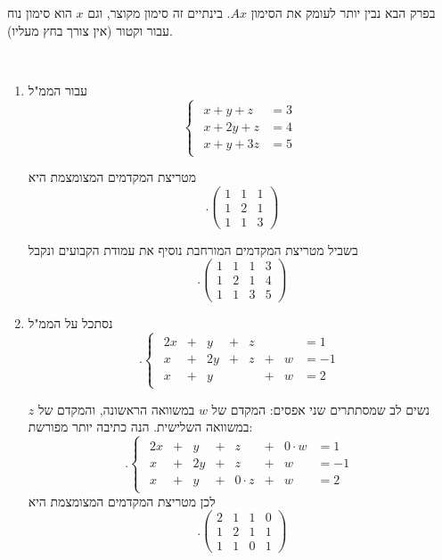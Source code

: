 \documentclass[
  hebrew,
  12pt,
  a4paper,
  oneside]{book}
\theoremstyle{definition}
\theoremstyle{remark}
\theoremstyle{plain}
\theoremstyle{remark}
\begin{document}
בפרק הבא נבין יותר לעומק את הסימון \(Ax\). בינתיים זה סימון מקוצר, וגם
\(x\) הוא סימון נוח עבור וקטור (אין צורך בחץ מעליו).

\begin{example}

~

\begin{enumerate}
\def\labelenumi{\arabic{enumi}.}
\item
  עבור הממ"ל \[\begin{cases}
  \begin{aligned}
  x+y+z&=3\\
  x+2y+z&=4\\
  x+y+3z&=5
  \end{aligned}
  \end{cases}\]

  מטריצת המקדמים המצומצמת היא \[.\begin{pmatrix}1 & 1 & 1\\
  1 & 2 & 1\\
  1 & 1 & 3
  \end{pmatrix}\]

  בשביל מטריצת המקדמים המורחבת נוסיף את עמודת הקבועים ונקבל
  \[.\left( \begin{array}{ccc|c}
  1 & 1 & 1 & 3\\
  1 & 2 & 1 & 4\\
  1 & 1 & 3 & 5
  \end{array} \right)\]
\item
  נסתכל על הממ"ל \[.\begin{cases}
  \begin{alignedat}{7}
  2x &{}+{}&  y &{}+{}&  z &     &      &= 1 \\[4pt]
   x &{}+{}& 2y &{}+{}&  z &{}+{}&  w &= -1 \\[4pt]
   x &{}+{}&  y &     &     &{}+{}&  w &= 2
  \end{alignedat}
  \end{cases}\]

  נשים לב שמסתתרים שני אפסים: המקדם של \(w\) במשוואה הראשונה, והמקדם של
  \(z\) במשוואה השלישית. הנה כתיבה יותר מפורשת: \[.\begin{cases}
  \begin{alignedat}{7}
  2x &{}+{}&  y &{}+{}&  z &{}+{}& 0\!\cdot\! w &=  1 \\[4pt]
   x &{}+{}& 2y &{}+{}&  z &{}+{}&     w &= -1 \\[4pt]
   x &{}+{}&  y &{}+{}& 0\!\cdot\! z &{}+{}&     w &=  2
  \end{alignedat}
  \end{cases}\] לכן מטריצת המקדמים המצומצמת היא
  \[.\begin{pmatrix}2 & 1 & 1 & 0\\
  1 & 2 & 1 & 1\\
  1 & 1 & 0 & 1
  \end{pmatrix}\]


\end{enumerate}
\end{example}
\end{document}
